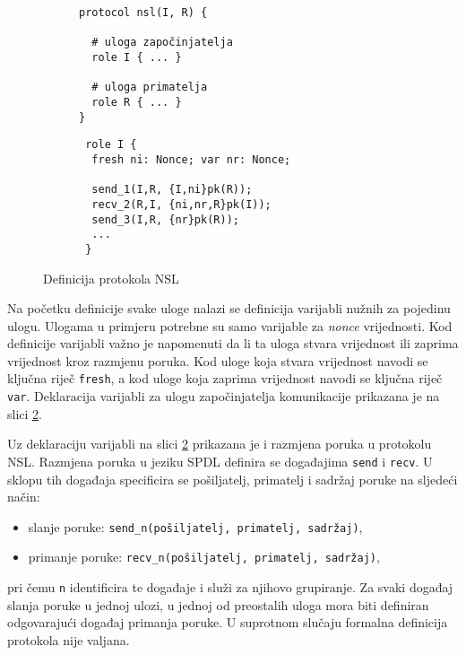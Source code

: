 \begin{figure}[htb]
\begin{subfigure}[t]{0.5\linewidth}
\begin{small}
\begin{verbatim}
protocol nsl(I, R) {

  # uloga započinjatelja
  role I { ... }

  # uloga primatelja
  role R { ... }
}
\end{verbatim}
\end{small}
\vspace{-5pt}
\label{fig:nsl_def}
\end{subfigure}
\begin{subfigure}[t]{0.5\linewidth}
\begin{small}
\begin{verbatim}
 role I {
  fresh ni: Nonce; var nr: Nonce;

  send_1(I,R, {I,ni}pk(R));
  recv_2(R,I, {ni,nr,R}pk(I));
  send_3(I,R, {nr}pk(R));
  ...
 }
\end{verbatim}
\end{small}
\vspace{-5pt}
\label{fig:nsl_var_sr}
\end{subfigure}
\label{fig:nsl}
\vspace{-5pt}
\caption{Definicija protokola NSL}
\end{figure}

Na početku definicije svake uloge nalazi se definicija varijabli nužnih za
pojedinu ulogu. Ulogama u primjeru potrebne su samo varijable za \emph{nonce}
vrijednosti. Kod definicije varijabli važno je
napomenuti da li ta uloga stvara vrijednost ili zaprima vrijednost kroz razmjenu
poruka. Kod uloge koja stvara vrijednost navodi se ključna riječ \texttt{fresh},
a kod uloge koja zaprima vrijednost navodi se ključna riječ \texttt{var}.
Deklaracija varijabli za ulogu započinjatelja komunikacije
prikazana je na slici \ref{fig:nsl_var_sr}.

Uz deklaraciju varijabli na slici \ref{fig:nsl_var_sr} prikazana je i razmjena
poruka u protokolu NSL. Razmjena poruka u jeziku SPDL definira se događajima
\texttt{send} i \texttt{recv}. U sklopu tih događaja specificira se
pošiljatelj, primatelj i sadržaj poruke na sljedeći način:
\begin{itemize}
    \item slanje poruke: \texttt{send\_n(pošiljatelj, primatelj, sadržaj)},
    \item primanje poruke: \texttt{recv\_n(pošiljatelj, primatelj, sadržaj)},
\end{itemize}
pri čemu \texttt{n} identificira te događaje i služi za njihovo grupiranje.
Za svaki događaj slanja poruke u jednoj ulozi,
u jednoj od preostalih uloga
mora biti definiran odgovarajući
događaj primanja poruke. U suprotnom slučaju
formalna definicija protokola nije valjana.

